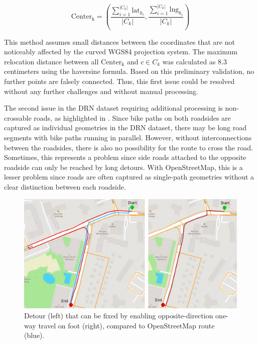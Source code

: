 \begin{equation}\text{Center}_{\text{k}} = \left(\frac{\sum_{i=1}^{|C_k|} \text{{lat}}_{k_i}}{|C_k|}, \frac{\sum_{i=1}^{|C_k|} \text{{lng}}_{k_i}}{|C_k|}\right)\end{equation}

This method assumes small distances between the coordinates that are not noticeably affected by the curved WGS84 projection system. The maximum relocation distance between all $\text{Center}_{\text{k}}$ and $c \in C_k$ was calculated as 8.3 centimeters using the haversine formula. Based on this preliminary validation, no further points are falsely connected. Thus, this first issue could be resolved without any further challenges and without manual processing.

The second issue in the DRN dataset requiring additional processing is non-crossable roads, as highlighted in . Since bike paths on both roadsides are captured as individual geometries in the DRN dataset, there may be long road segments with bike paths running in parallel. However, without interconnections between the roadsides, there is also no possibility for the route to cross the road. Sometimes, this represents a problem since side roads attached to the opposite roadside can only be reached by long detours. With OpenStreetMap, this is a lesser problem since roads are often captured as single-path geometries without a clear distinction between each roadside. 

\begin{figure}[htbp]
\centering
\includegraphics[width=\linewidth]{images/oneway-travel-fix.png}
\caption{Detour (left) that can be fixed by enabling opposite-direction one-way travel on foot (right), compared to OpenStreetMap route (blue).}
\label{fig:oneway-travel-fix}
\end{figure}

